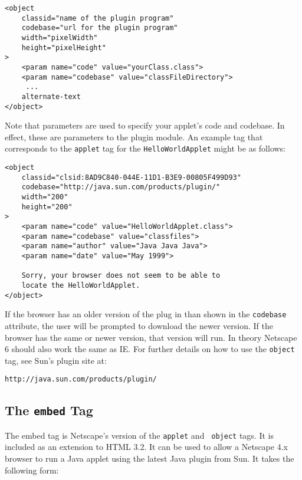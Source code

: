 \begin{jjjlisting}
\begin{lstlisting}
<object
    classid="name of the plugin program"
    codebase="url for the plugin program"
    width="pixelWidth"
    height="pixelHeight"
>
    <param name="code" value="yourClass.class">
    <param name="codebase" value="classFileDirectory">
     ...
    alternate-text
</object>
\end{lstlisting}
\end{jjjlisting}

\noindent Note that parameters are used to specify your
applet's code and codebase.  In effect, these are parameters
to the plugin module.  An example tag that corresponds
to the {\tt applet} tag for the {\tt HelloWorldApplet}
might be as follows:

\begin{jjjlisting}
\begin{lstlisting}
<object
    classid="clsid:8AD9C840-044E-11D1-B3E9-00805F499D93"
    codebase="http://java.sun.com/products/plugin/"
    width="200"
    height="200"
>
    <param name="code" value="HelloWorldApplet.class">
    <param name="codebase" value="classfiles">
    <param name="author" value="Java Java Java">
    <param name="date" value="May 1999">

    Sorry, your browser does not seem to be able to
    locate the HelloWorldApplet.
</object>
\end{lstlisting}
\end{jjjlisting}

\noindent If the browser has an older version of the plug in than
shown in the {\tt codebase} attribute, the user will be prompted to
download the newer version. If the browser has the same or newer
version, that version will run. In theory Netscape 6 should also work
the same as IE.  For further details on how to use the {\tt object}
tag, see Sun's plugin site at:

\begin{jjjlisting}
\begin{lstlisting}[commentstyle=\color{black}]
http://java.sun.com/products/plugin/
\end{lstlisting}
\end{jjjlisting}


\vspace{-6pt}\subsection*{The {\tt embed} Tag}
\noindent The embed tag is Netscape's version of the {\tt applet} and {\tt
object} tags.  It is included as an extension to HTML 3.2.  It can be used
to allow a Netscape 4.x browser to run a Java applet using the latest
Java plugin from Sun.  It takes the following form:

